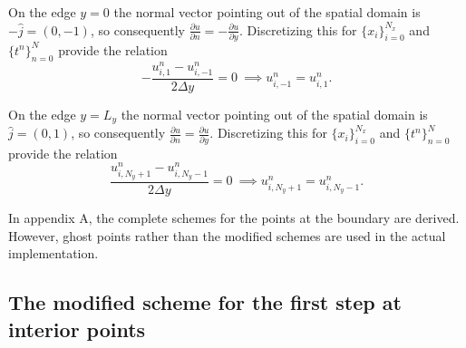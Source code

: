 \documentclass[twoside]{article}
\begin{document}
On the edge $y=0$ the normal vector pointing out of the spatial domain is $-\hat{j} = (0,-1)$, so consequently $\frac{\partial u}{\partial n} = -\frac{\partial u}{\partial y}$.
Discretizing this for $\{x_i\}_{i=0}^{N_x}$ and $\{t^n\}_{n=0}^N$ provide the relation
\begin{equation}
-\frac{u_{i,1}^n - u_{i,-1}^n}{2\Delta y} = 0 \ \implies u_{i,-1}^n = u_{i,1}^n.
\label{bc:y0}
\end{equation}


On the edge $y=L_y$ the normal vector pointing out of the spatial domain is $\hat{j} = (0,1)$, so consequently $\frac{\partial u}{\partial n} = \frac{\partial u}{\partial y}$.
Discretizing this for $\{x_i\}_{i=0}^{N_x}$ and $\{t^n\}_{n=0}^N$ provide the relation
\begin{equation}
\frac{u_{i,N_y + 1}^n - u_{i,N_y - 1}^n}{2\Delta y} = 0 \ \implies u_{i,N_y + 1}^n = u_{i,N_y -1}^n.
\label{bc:yL}
\end{equation}

In appendix A, the complete schemes for the points at the boundary are derived. However, ghost points rather than the modified schemes are used in the actual implementation.


\subsection{The modified scheme for the first step at interior points}
\end{document}
